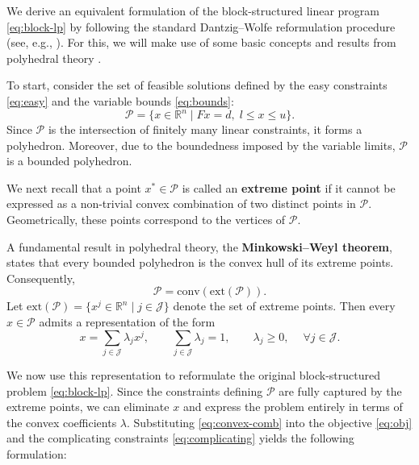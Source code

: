 \documentclass{book}
\theoremstyle{definition}
\numberwithin{algorithm_}{chapter}
\begin{document}
We derive an equivalent formulation of the block-structured linear program \eqref{eq:block-lp} by following the standard Dantzig--Wolfe reformulation procedure (see, e.g., \cite{uchoa2024optimizing}). For this, we will make use of some basic concepts and results from polyhedral theory \cite{ziegler1995polytopes}.

\bigskip

To start, consider the set of feasible solutions defined by the easy constraints \eqref{eq:easy} and the variable bounds \eqref{eq:bounds}:
\begin{equation}\label{eq:P}
\mathcal{P} = \{ x \in \mathbb{R}^n \mid Fx = d, \; l \le x \le u \}.
\end{equation}
Since $\mathcal{P}$ is the intersection of finitely many linear constraints, it forms a polyhedron. Moreover, due to the boundedness imposed by the variable limits, $\mathcal{P}$ is a bounded polyhedron.

\medskip

We next recall that a point $x^* \in \mathcal{P}$ is called an \textbf{extreme point} if it cannot be expressed as a non-trivial convex combination of two distinct points in $\mathcal{P}$. Geometrically, these points correspond to the vertices of $\mathcal{P}$.

\medskip

A fundamental result in polyhedral theory, the \textbf{Minkowski--Weyl theorem}, states that every bounded polyhedron is the convex hull of its extreme points. Consequently,
\[
\mathcal{P} = \mathrm{conv}(\mathrm{ext}(\mathcal{P})).
\]
Let $\mathrm{ext}(\mathcal{P}) = \{x^j \in \mathbb{R}^n \mid j \in \mathcal{J}\}$ denote the set of extreme points. Then every $x \in \mathcal{P}$ admits a representation of the form
\begin{equation}\label{eq:convex-comb}
x = \sum_{j \in \mathcal{J}} \lambda_j x^j, 
\qquad \sum_{j \in \mathcal{J}} \lambda_j = 1, 
\qquad \lambda_j \ge 0, \quad \ \forall j \in \mathcal{J}.
\end{equation}

\medskip

We now use this representation to reformulate the original block-structured problem \eqref{eq:block-lp}. Since the constraints defining $\mathcal{P}$ are fully captured by the extreme points, we can eliminate $x$ and express the problem entirely in terms of the convex coefficients $\lambda$. Substituting \eqref{eq:convex-comb} into the objective \eqref{eq:obj} and the complicating constraints \eqref{eq:complicating} yields the following formulation:
\end{document}
